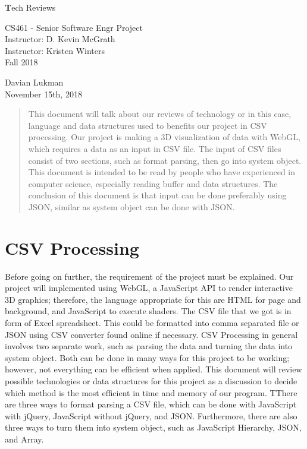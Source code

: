 \documentclass[letterpaper,10pt,titlepage, onecolumn, draftclsnofoot]{IEEEtran}
\begin{document}
\begin{center}
  
  \textbf{}

  \vspace{4cm}
  \Huge{}
  \textbf Tech Reviews
  \vspace{1.5cm}

 
  \LARGE
  CS461 - Senior Software Engr Project\\
  \vspace{0.25cm}
  Instructor: D. Kevin McGrath \\
  Instructor: Kristen Winters \\
  \vspace{0.25cm}
  Fall 2018 \\
  \vspace{1.5cm}
  
  \large{Davian Lukman}\\
  \vfill
  November 15th, 2018\\
  \vspace{1cm}
  \vspace*{\fill}
   \begin{abstract}
       \noindent This document will talk about our reviews of technology or in this case, language and data structures used to benefits our project in CSV processing. Our project is making a 3D visualization of data with WebGL, which requires a data as an input in CSV file. The input of CSV files consist of two sections, such as format parsing, then go into system object. This document is intended to be read by people who have experienced in computer science, especially reading buffer and data structures. The conclusion of this document is that input can be done preferably using JSON, similar as system object can be done with JSON.
   \end{abstract}
   \normalsize 
  \end{center}
  
\section{CSV Processing}
Before going on further, the requirement of the project must be explained. Our project will implemented using WebGL\cite{WebGL}, a JavaScript API to render interactive 3D graphics; therefore, the language appropriate for this are HTML for page and background, and JavaScript to execute shaders. The CSV file that we got is in form of Excel spreadsheet. This could be formatted into comma separated file or JSON using CSV converter found online if necessary.\newline
CSV Processing in general involves two separate work, such as parsing the data and turning the data into system object. Both can be done in many ways for this project to be working; however, not everything can be efficient when applied. This document will review possible technologies or data structures for this project as a discussion to decide which method is the most efficient in time and memory of our program. TThere are three ways to format parsing a CSV ﬁle, which can be done with JavaScript with jQuery, JavaScript without jQuery, and JSON. Furthermore, there are also three ways to turn them into system object, such as JavaScript Hierarchy, JSON, and Array.
\end{document}
